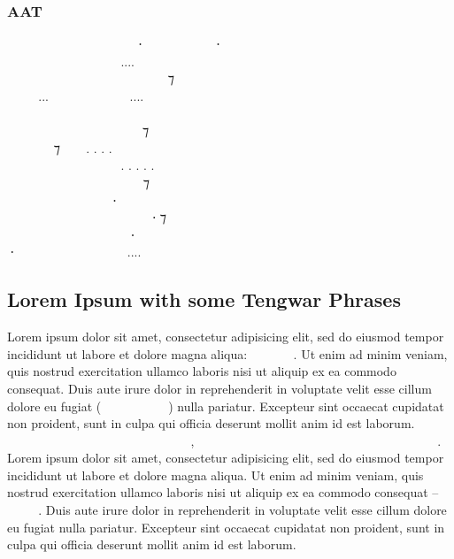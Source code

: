 \documentclass[11pt,a4paper]{article}
\begin{document}
\subsubsection*{AAT}

\formalAAT

  ‍   ⸱‍  ‍ ⸱ \\
    ‍....  ‍  \\
  ‍   ‍ ‍ ⁊ ‍  \\
...  ....   \\
         ‍ \\
 ‍ ‍‍   ⁊  ‍ ‍ \\
 ‍ ⁊  . . . .  ‍ ‍‍   \\
   ‍ . . . . . ‍ ‍   \\
      ⁊    \\
   ‍⸱‍   ‍  \\
     ‍⸱ ⁊  ‍ \\
    ⸱    \\
⸱  ‍  .... ‍‍    \\

\normalfont

\newpage

\subsection{Lorem Ipsum with some Tengwar Phrases}

Lorem ipsum dolor sit amet, consectetur adipisicing elit, sed do eiusmod tempor incididunt ut labore et dolore magna aliqua: \formalGR  \normalfont. Ut enim ad minim veniam, quis nostrud exercitation ullamco laboris nisi ut aliquip ex ea commodo consequat. Duis aute irure dolor in reprehenderit in voluptate velit esse cillum dolore eu fugiat (\formalGR  \normalfont) nulla pariatur. Excepteur sint occaecat cupidatat non proident, sunt in culpa qui officia deserunt mollit anim id est laborum. \formalGR      ,           . \normalfont Lorem ipsum dolor sit amet, consectetur adipisicing elit, sed do eiusmod tempor incididunt ut labore et dolore magna aliqua. Ut enim ad minim veniam, quis nostrud exercitation ullamco laboris nisi ut aliquip ex ea commodo consequat – \formalGR \normalfont. Duis aute irure dolor in reprehenderit in voluptate velit esse cillum dolore eu fugiat nulla pariatur. Excepteur sint occaecat cupidatat non proident, sunt in culpa qui officia deserunt mollit anim id est laborum.
\end{document}
